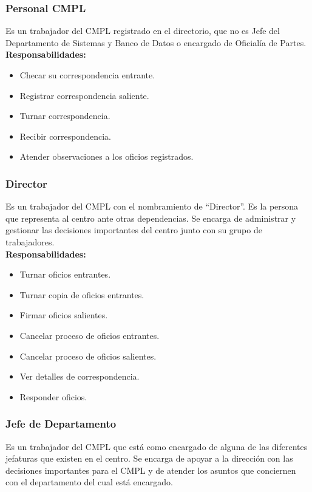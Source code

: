 \subsubsection{Personal CMPL}
Es un trabajador del CMPL registrado en el directorio, que no es Jefe del Departamento de Sistemas y Banco de Datos o encargado de Oficialía de Partes.\\

\textbf{Responsabilidades:}
\begin{itemize}
	\item Checar su correspondencia entrante.
	\item Registrar correspondencia saliente.
	\item Turnar correspondencia.
	\item Recibir correspondencia.
	\item Atender observaciones a los oficios registrados.
\end{itemize}

\subsubsection{Director}
Es un trabajador del CMPL con el nombramiento de “Director”. Es la persona que representa al centro ante otras dependencias. Se encarga de administrar y gestionar las decisiones importantes del centro junto con su grupo de trabajadores.\\

\textbf{Responsabilidades:}
\begin{itemize}
	\item Turnar oficios entrantes.
	\item Turnar copia de oficios entrantes.
	\item Firmar oficios salientes.
	\item Cancelar proceso de oficios entrantes.
	\item Cancelar proceso de oficios salientes.
	\item Ver detalles de correspondencia.
	\item Responder oficios.
\end{itemize}

\subsubsection{Jefe de Departamento}
Es un trabajador del CMPL que está como encargado de alguna de las diferentes jefaturas que existen en el centro. Se encarga de apoyar a la dirección con las decisiones importantes para el CMPL y de atender los asuntos que conciernen con el departamento del cual está encargado.\\

